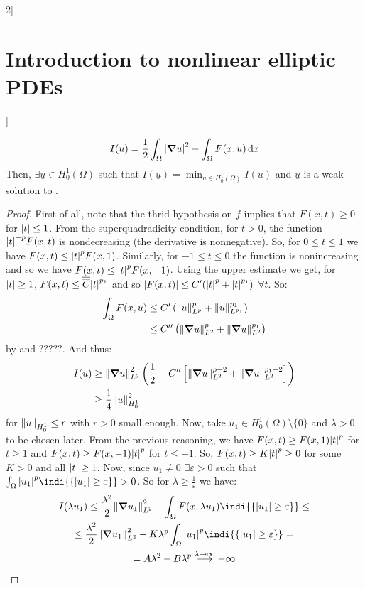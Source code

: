 \documentclass[../../../main_math.tex]{subfiles}
\begin{document}
\begin{multicols}{2}[\section{Introduction to nonlinear elliptic PDEs}]
\begin{proposition}
    $$
      I(u)=\frac{1}{2}\int_\Omega \abs{\grad u}^2-\int_\Omega F(x,u)\dd{x}
    $$
    Then, $\exists \underline{u}\in H_0^1(\Omega)$ such that $I(\underline{u})=\displaystyle \min_{u\in H_0^1(\Omega)}I(u)$ and $\underline{u}$ is a weak solution to .
  \end{proposition}
  \begin{proof}
    First of all, note that the thrid hypothesis on $f$ implies that $F(x,t)\geq 0$ for $\abs{t}\leq 1$. From the superquadradicity condition, for $t>0$, the function $\abs{t}^{-p}F(x,t)$ is nondecreasing (the derivative is nonnegative). So, for $0\leq t\leq 1$ we have $F(x,t)\leq \abs{t}^p F(x,1)$. Similarly, for $-1\leq t\leq 0$ the function is nonincreasing and so we have $F(x,t)\leq \abs{t}^p F(x,-1)$. Using the upper estimate we get, for $\abs{t}\geq 1$, ${F(x,t)}\leq \overline{\overline{C}} \abs{t}^{p_1}$ and so
    $\abs{F(x,t)}\leq C'(\abs{t}^p+\abs{t}^{p_1})$ $\forall t$. So:
    \begin{align*}
      \int_\Omega {F(x,u)} & \leq C'\left(\norm{u}_{L^{p}}^p+\norm{u}_{L^{p_1}}^{p_1}\right)        \\
                           & \leq C''\left(\norm{\grad u}_{L^2}^p+\norm{\grad u}_{L^2}^{p_1}\right)
    \end{align*}
    by  and ?????. And thus:
    \begin{align}
      I(u) & \geq \norm{\grad u}_{L^2}^2\left(\frac{1}{2}-C''\left[\norm{\grad u}_{L^2}^{p-2}+\norm{\grad u}_{L^2}^{p_1-2}\right]\right)\nonumber \\
           & \label{INEPDE:I_mountain}\geq \frac{1}{4}\norm{u}_{H_0^1}^2
    \end{align}
    for $\norm{u}_{H_0^1}\leq r$ with $r>0$ small enough. Now, take $u_1\in H_0^1(\Omega)\setminus\{0\}$ and $\lambda>0$ to be chosen later. From the previous reasoning, we have $F(x,t)\geq F(x,1)\abs{t}^{p}$ for $t\geq 1$ and $F(x,t)\geq F(x,-1)\abs{t}^{p}$ for $t\leq -1$. So, $F(x,t)\geq K\abs{t}^{p}\geq0$ for some $K>0$ and all $\abs{t} \geq 1$. Now, since $u_1\ne 0$ $\exists \varepsilon>0$ such that $\int_\Omega \abs{u_1}^p\indi{\{\abs{u_1}\geq \varepsilon\}}>0$. So for $\lambda\geq \frac{1}{\varepsilon}$ we have:
    \begin{multline*}
      I(\lambda u_1) \leq \frac{\lambda^2}{2}\norm{\grad u_1}_{L^2}^2-\int_\Omega F(x,\lambda u_1)\indi{\{\abs{u_1}\geq \varepsilon\}}\leq\\\leq \frac{\lambda^2}{2}\norm{\grad u_1}_{L^2}^2-K\lambda^p\int_\Omega \abs{u_1}^p\indi{\{\abs{u_1}\geq \varepsilon\}}=\\=A\lambda^2-B\lambda^p\overset{\lambda\to\infty}{\longrightarrow} -\infty

\end{multline*}
\end{proof}
\end{multicols}
\end{document}

